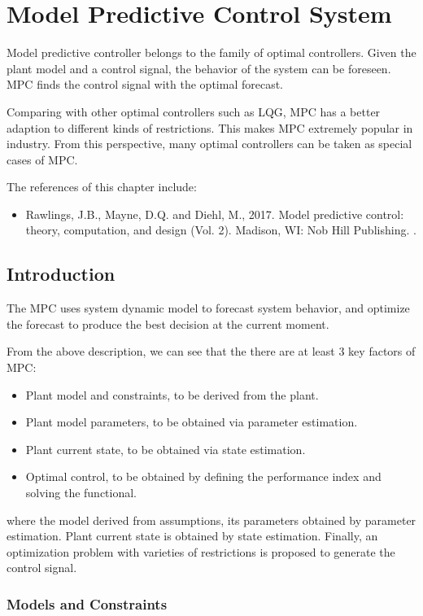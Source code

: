 \chapter{Model Predictive Control System} \label{ch:mpcs}

Model predictive controller belongs to the family of optimal controllers. Given the plant model and a control signal, the behavior of the system can be foreseen. MPC finds the control signal with the optimal forecast.

Comparing with other optimal controllers such as LQG, MPC has a better adaption to different kinds of restrictions. This makes MPC extremely popular in industry. From this perspective, many optimal controllers can be taken as special cases of MPC.

The references of this chapter include:
\begin{itemize}
	\item Rawlings, J.B., Mayne, D.Q. and Diehl, M., 2017. Model predictive control: theory, computation, and design (Vol. 2). Madison, WI: Nob Hill Publishing. \cite{rawlings2017model}.
\end{itemize}

\section{Introduction}

The MPC uses system dynamic model to forecast system behavior, and optimize the forecast to produce the best decision at the current moment.

From the above description, we can see that the there are at least 3 key factors of MPC:
\begin{itemize}
	\item Plant model and constraints, to be derived from the plant.
    \item Plant model parameters, to be obtained via parameter estimation.
	\item Plant current state, to be obtained via state estimation.
	\item Optimal control, to be obtained by defining the performance index and solving the functional.
\end{itemize}
where the model derived from assumptions, its parameters obtained by parameter estimation. Plant current state is obtained by state estimation. Finally, an optimization problem with varieties of restrictions is proposed to generate the control signal.

\subsection{Models and Constraints}

